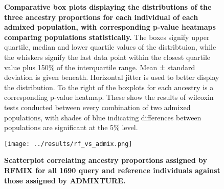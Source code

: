 \documentclass[11pt]{article}
\begin{document}




\begin{figure}[htb!]%
    \centering
     \hspace*{0em}
        \vspace{-0.6cm}
        \caption{\textbf{
            Comparative box plots displaying the distributions of the three ancestry proportions for each individual of each admixed population, with corresponding p-value heatmaps comparing populations statistically.
        }
            The boxes signify upper quartile, median and lower quartile values of the distribtuion, while the whiskers signify the last data point within the closest quartile value plus 150\% of the interquartile range. Mean ± standard deviation is given beneath. Horizontal jitter is used to better display the distribution. To the right of the boxplots for each ancestry is a corresponding p-value heatmap. These show the results of wilcoxin tests conducted between every combination of two admixed populations, with shades of blue indicating differences between populations are significant at the 5\% level.
        }
\end{figure}




\begin{figure}[htb!]%
    \centering
    \texttt{[image: ../results/rf\_vs\_admix.png]} 
    \vspace{.2cm}
    \caption{\textbf{
        Scatterplot correlating ancestry proportions assigned by RFMIX for all 1690 query and reference individuals against those assigned by ADMIXTURE.
    }
    }
\end{figure}
\end{document}
